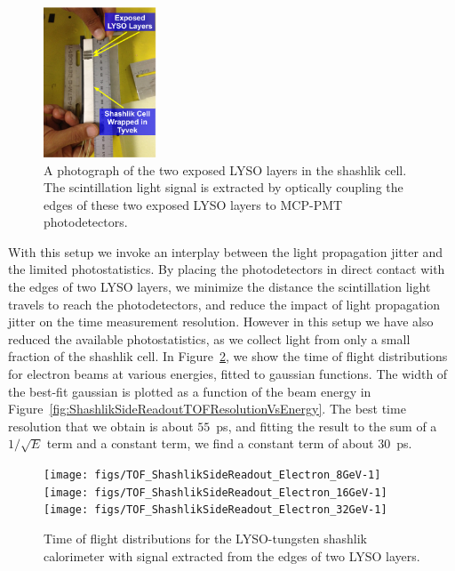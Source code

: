 \documentclass[12pt]{article}
\begin{document}
\begin{figure}[H] \centering
\includegraphics[width=0.30\textwidth]{figs/ShashlikSideReadoutPhotoA} 
\caption{\small A photograph of the two exposed LYSO layers in the shashlik cell.
The scintillation light signal is extracted by optically coupling
the edges of these two exposed LYSO layers to MCP-PMT
photodetectors. } 
\label{fig:ShashlikSideReadoutExposedLayersPhoto}
\end{figure}


With this setup we invoke an interplay between the light propagation jitter 
and the limited photostatistics. By placing the photodetectors in direct contact with the edges of two LYSO layers, we minimize
the distance the scintillation light  travels to reach the photodetectors,
and reduce the impact of light propagation jitter on the time measurement resolution. However 
in this setup we have also reduced the available photostatistics, as we collect light from only a
small fraction of the shashlik cell. In Figure~\ref{fig:ShashlikSideReadoutTOF},
we show the time of flight distributions for electron beams at various energies,
fitted to gaussian functions. The width of the best-fit gaussian is plotted as a
function of the beam energy in Figure~\ref{fig:ShashlikSideReadoutTOFResolutionVsEnergy}. The best time
resolution that we obtain is about $55$~ps, and fitting the result to the sum of
a $1/\sqrt{E}$ term and a constant term, we find a constant term of about
$30$~ps. 

\begin{figure}[H] \centering
\texttt{[image: figs/TOF\_ShashlikSideReadout\_Electron\_8GeV-1]} 
\texttt{[image: figs/TOF\_ShashlikSideReadout\_Electron\_16GeV-1]} 
\texttt{[image: figs/TOF\_ShashlikSideReadout\_Electron\_32GeV-1]} 
\caption{ Time of flight distributions for the LYSO-tungsten shashlik calorimeter
with signal extracted from the edges of two LYSO layers. } 
\label{fig:ShashlikSideReadoutTOF}
\end{figure}
\end{document}
